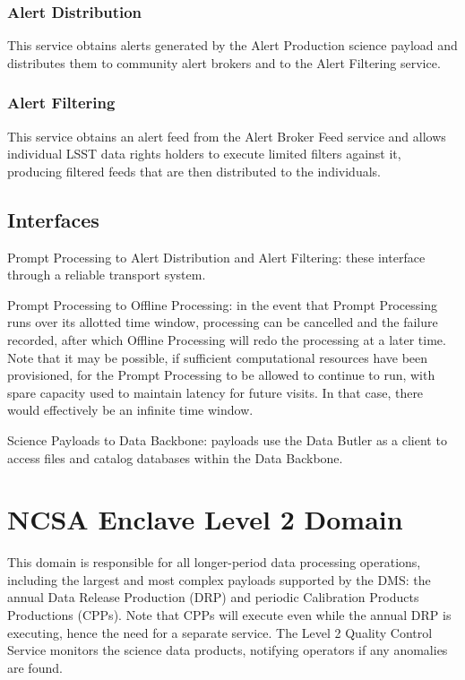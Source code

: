 \documentclass[DM,lsstdraft,toc]{lsstdoc}
\begin{document}
\subsubsection{Alert Distribution}\label{alert-distribution}

This service obtains alerts generated by the Alert Production science
payload and distributes them to community alert brokers and to the Alert
Filtering service.

\subsubsection{Alert Filtering}\label{alert-filtering}

This service obtains an alert feed from the Alert Broker Feed service
and allows individual LSST data rights holders to execute limited
filters against it, producing filtered feeds that are then distributed
to the individuals.

\subsection{Interfaces}\label{interfaces-1}

Prompt Processing to Alert Distribution and Alert Filtering: these
interface through a reliable transport system.

Prompt Processing to Offline Processing: in the event that Prompt
Processing runs over its allotted time window, processing can be
cancelled and the failure recorded, after which Offline Processing will
redo the processing at a later time. Note that it may be possible, if
sufficient computational resources have been provisioned, for the Prompt
Processing to be allowed to continue to run, with spare capacity used to
maintain latency for future visits. In that case, there would
effectively be an infinite time window.

Science Payloads to Data Backbone: payloads use the Data Butler as a
client to access files and catalog databases within the Data Backbone.

\section{NCSA Enclave Level 2 Domain}\label{ncsa-enclave-level-2-domain}

This domain is responsible for all longer-period data processing
operations, including the largest and most complex payloads supported by
the DMS: the annual Data Release Production (DRP) and periodic
Calibration Products Productions (CPPs). Note that CPPs will execute
even while the annual DRP is executing, hence the need for a separate
service. The Level 2 Quality Control Service monitors the science data
products, notifying operators if any anomalies are found.
\end{document}

